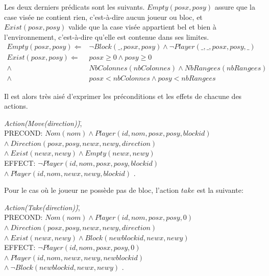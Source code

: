\documentclass[12pt,english,frenchb,letterpaper]{article}
\begin{document}
Les deux derniers prédicats sont les suivants.  $Empty(posx,posy)$ assure que la case visée ne contient rien, c'est-à-dire aucun joueur ou bloc, et $Exist(posx,posy)$ valide que la case visée appartient bel et bien à l'environnement, c'est-à-dire qu'elle est contenue dans ses limites.
\begin{eqnarray*}
	Empty(posx,posy) \Leftarrow & \lnot Block(\_,posx,posy)  \wedge \lnot Player(\_,\_,posx,posy,\_) \\
	Exist(posx,posy) \Leftarrow & posx  \geq 0 \wedge posy \geq 0 \\
	                                                    \wedge & NbColonnes(nbColonnes)  \wedge NbRangees(nbRangees) \\
	                                                   \wedge & posx < nbColonnes \wedge posy < nbRangees 
\end{eqnarray*}

Il est alors très aisé d'exprimer les préconditions et les effets de chacune des actions.

\begin{tabbing}
\textit{Action}\=\textit{(Move(direction))}\=,\\
\> PRECOND: \> $Nom(nom) \wedge Player(id,nom,posx,posy,blockid)$ \\ 
\> \> $  \wedge \ Direction(posx,posy,newx,newy,direction) $ \\
\> \> $   \wedge \ Exist(newx,newy) \wedge Empty(newx,newy) $ \\               
\> EFFECT: \>$ \lnot Player(id,nom,posx,posy,blockid) $ \\
\>  \> $\wedge\ Player(id,nom,newx,newy,blockid)$ .\\
\end{tabbing}

Pour le cas où le joueur ne possède pas de bloc, l'action $take$ est la suivante:

\begin{tabbing}
\textit{Action}\=\textit{(Take(direction))}\=,\\
\> PRECOND: \> $Nom(nom) \wedge Player(id,nom,posx,posy,0)$ \\ 
\> \> $  \wedge \ Direction(posx,posy,newx,newy,direction) $ \\
\> \> $   \wedge \ Exist(newx,newy) \wedge Block(newblockid,newx,newy) $ \\               
\> EFFECT: \>$ \lnot Player(id,nom,posx,posy,0) $ \\
\>  \> $\wedge\ Player(id,nom,newx,newy,newblockid)$ \\
\> \> $\wedge\ \lnot Block(newblockid,newx,newy) $ .\\
\end{tabbing}
\end{document}
